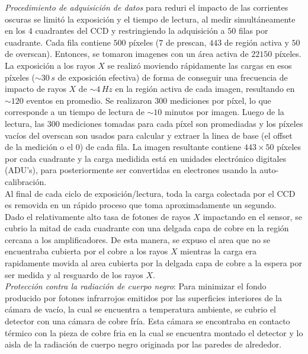 \indent \textit{Procedimiento de adquisición de datos} para reduri el impacto de las corrientes oscuras se limitó la exposición  y el tiempo de lectura, al medir simultáneamente en los $4$ cuadrantes del CCD y restringiendo la adquisición a $50$ filas por cuadrante. Cada fila contiene $500$ píxeles ($7$ de prescan, $443$ de región activa y $50$ de overscan). Entonces, se tomaron imagenes con un área activa de $22150$ píxeles. La exposición a los rayos $X$ se realizó moviendo rápidamente las cargas en esos píxeles ($\sim 30\,\si{s}$ de exposición efectiva) de forma de conseguir una frecuencia de impacto de rayos $X$ de $\sim 4\,\si{Hz}$ en la región activa de cada imagen, resultando en $\sim 120$ eventos en promedio. Se realizaron $300$ mediciones por píxel, lo que corresponde a un tiempo de lectura de $\sim 10$ minutos por imagen. Luego de la lectura, las $300$ mediciones tomadas para cada píxel son promediadas y los píxeles vacíos del overscan  son usados para calcular y extraer la linea de base (el offset de la medición o el $0$) de cada fila. La imagen resultante contiene $443 \times 50$ píxeles por cada cuadrante y la carga medidida está en unidades electrónico digitales (ADU's), para posteriormente ser convertidas en electrones usando la auto-calibración.\\
\indent Al final de cada ciclo de exposición/lectura, toda la carga colectada por el CCD es removida en un rápido proceso que toma aproximadamente un segundo.\\
\indent Dado el relativamente alto tasa de fotones de rayos $X$ impactando en el sensor, se cubrio la mitad de cada cuadrante con una delgada capa de cobre en la región cercana a los amplificadores. De esta manera, se expuso el area que no se encuentraba cubierta por el cobre a los rayos $X$ mientras la carga era rapidamente movida al area cubierta por la delgada capa de cobre a la espera por ser medida y al resguardo de los rayos $X$.\\
\textit{Protección contra la radiación de cuerpo negro}: Para minimizar el fondo producido por fotones infrarrojos emitidos por las superficies interiores de la cámara de vacío, la cual se encuentra a temperatura ambiente, se cubrio el detector con una cámara de cobre fría. Esta cámara se encontraba en contacto térmico con la pieza de cobre fria en la cual se encuentra montado el detector y lo aisla de la radiación de cuerpo negro originada por las paredes de alrededor.\\

